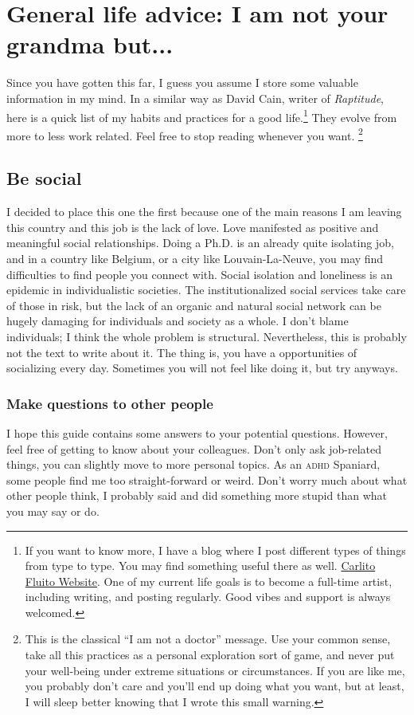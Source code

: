 \documentclass{article}
\begin{document}
\section{General life advice: I am not your grandma but...}
\label{sec: life advice}
Since you have gotten this far, I guess you assume I store some valuable information in my mind. In a similar way as David Cain, writer of \textit{Raptitude}, here is a quick list of my habits and practices for a good life.\footnote{If you want to know more, I have a blog where I post different types of things from type to type. You may find something useful there as well. \href{www.carlitofluitoideas.com}{Carlito Fluito Website}.  One of my current life goals is to become a full-time artist, including writing, and posting regularly. Good vibes and support is always welcomed.}  They evolve from more to less work related. Feel free to stop reading whenever you want. \footnote{ This is the classical ``I am not a doctor'' message. Use your common sense, take all this practices as a personal exploration sort of game, and never put your well-being under extreme situations or circumstances. If you are like me, you probably don’t care and you’ll end up doing what you want, but at least, I will sleep better knowing that I wrote this small warning.}

\subsection{Be social}
\label{subsec: Social}
I decided to place this one the first because one of the main reasons I am leaving this country and this job is the lack of love. Love manifested as positive and meaningful social relationships. Doing a Ph.D. is an already quite isolating job, and in a country like Belgium, or a city like Louvain-La-Neuve, you may find difficulties to find people you connect with. Social isolation and loneliness is an epidemic in individualistic societies. The institutionalized social services take care of those in risk, but the lack of an organic and natural social network can be hugely damaging for individuals and society as a whole. I don’t blame individuals; I think the whole problem is structural. Nevertheless, this is probably not the text to write about it. The thing is, you have a opportunities of socializing every day. Sometimes you will not feel like doing it, but try anyways. 

\subsubsection{Make questions to other people}
\label{subsubsec: ask others}
I hope this guide contains some answers to your potential questions. However, feel free of getting to know about your colleagues. Don’t only ask job-related things, you can slightly move to more personal topics. As an \textsc{adhd} Spaniard, some people find me too straight-forward or weird. Don’t worry much about what other people think, I probably said and did something more stupid than what you may say or do. 
\end{document}
